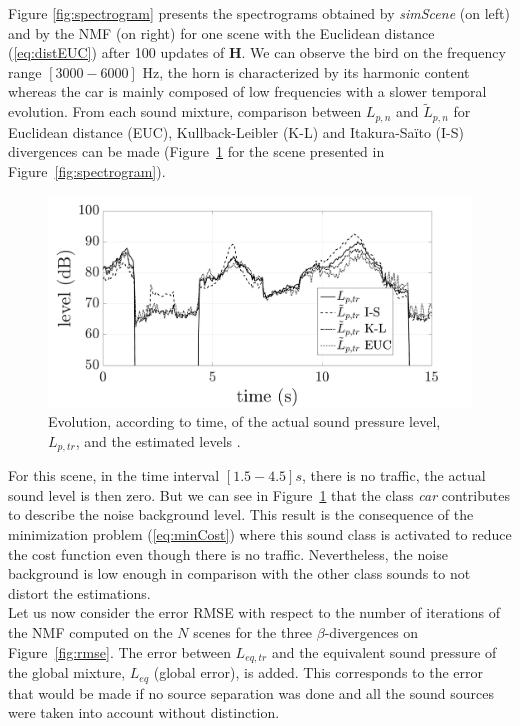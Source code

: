 \documentclass{article}
\begin{document}
\begin{sloppy}
Figure \ref{fig:spectrogram} presents the spectrograms obtained by \textit{simScene} (on left) and by the NMF (on right) for one scene with the Euclidean distance (\ref{eq:distEUC}) after 100 updates of $\mathbf{H}$. We can observe the bird on the frequency range $\left[3000-6000\right]$ Hz, the horn is characterized by its harmonic content whereas the car is mainly composed of low frequencies with a slower temporal evolution. From each sound mixture, comparison between $L_{p,n}$ and $\tilde{L}_{p,n}$ for Euclidean distance (EUC), Kullback-Leibler (K-L) and Itakura-Saïto (I-S) divergences can be made (Figure~\ref{fig:Lp} for the scene presented in Figure~\ref{fig:spectrogram}).\\

\begin{figure}[t]
\centering
\centerline{\includegraphics[width=.5\textwidth]{images/Lp_bvak_Sc2_It100_nbCl3.pdf}}
\caption{Evolution, according to time, of the actual sound pressure level, $L_{p,tr}$, and the estimated levels .}
\label{fig:Lp}
\end{figure}

For this scene, in the time interval $\left[ 1.5 - 4.5\right] s$, there is no traffic, the actual sound level is then zero. But we can see in Figure~\ref{fig:Lp} that the class \textit{car} contributes to describe the noise background level. This result is the consequence of the minimization problem (\ref{eq:minCost}) where this sound class is activated to reduce the cost function even though there is no traffic. Nevertheless, the noise background is low enough in comparison with the other class sounds to not distort the estimations.\\

Let us now consider the error RMSE with respect to the number of iterations of the NMF computed on the $N$ scenes for the three $\beta$-divergences on Figure~\ref{fig:rmse}. The error between $L_{eq,tr}$ and the equivalent sound pressure of the global mixture, $L_{eq}$ (global error), is added. This corresponds to the error that would be made if no source separation was done and all the sound sources were taken into account without distinction.\\


\end{sloppy}
\end{document}
